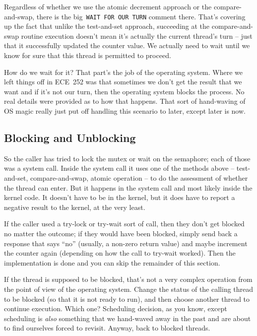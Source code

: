 Regardless of whether we use the atomic decrement approach or the compare-and-swap, there is the big~\texttt{WAIT FOR OUR TURN} comment there. That's covering up the fact that unlike the test-and-set approach, succeeding at the compare-and-swap routine execution doesn't mean it's actually the current thread's turn -- just that it successfully updated the counter value. We actually need to wait until we know for sure that this thread is permitted to proceed.

How do we wait for it? That part's the job of the operating system. Where we left things off in ECE~252 was that sometimes we don't get the result that we want and if it's not our turn, then the operating system blocks the process. No real details were provided as to how that happens. That sort of hand-waving of OS magic really just put off handling this scenario to later, except later is now.

\subsection*{Blocking and Unblocking}

So the caller has tried to lock the mutex or wait on the semaphore; each of those was a system call. Inside the system call it uses one of the methods above -- test-and-set, compare-and-swap, atomic operation -- to do the assessment of whether the thread can enter. But it happens in the system call and most likely inside the kernel code. It doesn't have to be in the kernel, but it does have to report a negative result to the kernel, at the very least.

If the caller used a try-lock or try-wait sort of call, then they don't get blocked no matter the outcome; if they would have been blocked, simply send back a response that says ``no'' (usually, a non-zero return value) and maybe increment the counter again (depending on how the call to try-wait worked). Then the implementation is done and you can skip the remainder of this section. 

If the thread is supposed to be blocked, that's not a very complex operation from the point of view of the operating system. Change the status of the calling thread to be blocked (so that it is not ready to run), and then choose another thread to continue execution. Which one? Scheduling decision, as you know, except scheduling is \textit{also} something that we hand-waved away in the past and are about to find ourselves forced to revisit. Anyway, back to blocked threads.  

